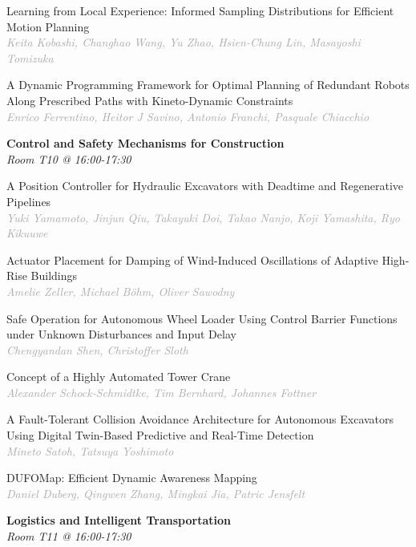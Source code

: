 \begin{multicols*}{2}
\small Learning from Local Experience: Informed Sampling Distributions for Efficient Motion Planning\\ 
\footnotesize \textcolor{darkgray}{\textit{Keita Kobashi, Changhao  Wang, Yu  Zhao, Hsien-Chung  Lin, Masayoshi  Tomizuka}}

\small A Dynamic Programming Framework for Optimal Planning of Redundant Robots Along Prescribed Paths with Kineto-Dynamic Constraints\\ 
\footnotesize \textcolor{darkgray}{\textit{Enrico Ferrentino, Heitor J  Savino, Antonio  Franchi, Pasquale  Chiacchio}}

\normalsize \textbf{Control and Safety Mechanisms for Construction}\\
\small \textit{Room T10 @ 16:00-17:30}

\small A Position Controller for Hydraulic Excavators with Deadtime and Regenerative Pipelines\\ 
\footnotesize \textcolor{darkgray}{\textit{Yuki Yamamoto, Jinjun  Qiu, Takayuki  Doi, Takao  Nanjo, Koji  Yamashita, Ryo  Kikuuwe}}

\small Actuator Placement for Damping of Wind-Induced Oscillations of Adaptive High-Rise Buildings\\ 
\footnotesize \textcolor{darkgray}{\textit{Amelie Zeller, Michael  Böhm, Oliver  Sawodny}}

\small Safe Operation for Autonomous Wheel Loader Using Control Barrier Functions under Unknown Disturbances and Input Delay\\ 
\footnotesize \textcolor{darkgray}{\textit{Chengyandan Shen, Christoffer  Sloth}}

\small Concept of a Highly Automated Tower Crane\\ 
\footnotesize \textcolor{darkgray}{\textit{Alexander Schock-Schmidtke, Tim  Bernhard, Johannes  Fottner}}

\small A Fault-Tolerant Collision Avoidance Architecture for Autonomous Excavators Using Digital Twin-Based Predictive and Real-Time Detection\\ 
\footnotesize \textcolor{darkgray}{\textit{Mineto Satoh, Tatsuya  Yoshimoto}}

\small DUFOMap: Efficient Dynamic Awareness Mapping\\ 
\footnotesize \textcolor{darkgray}{\textit{Daniel Duberg, Qingwen  Zhang, Mingkai  Jia, Patric  Jensfelt}}

\normalsize \textbf{Logistics and Intelligent Transportation}\\
\small \textit{Room T11 @ 16:00-17:30}


\end{multicols*}
